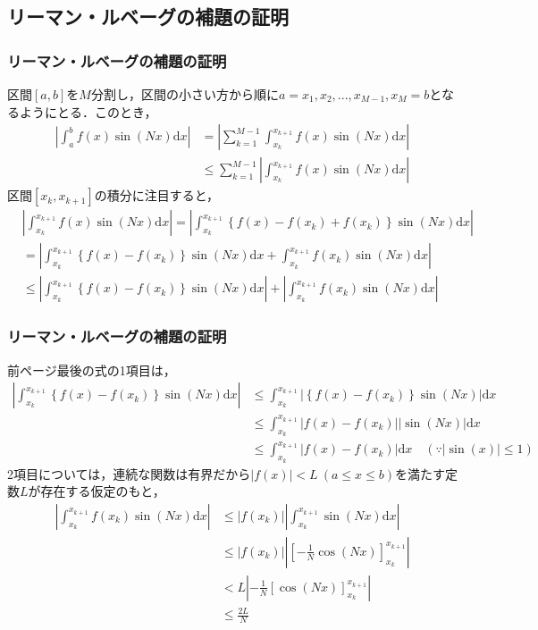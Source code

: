 \documentclass[dvipdfmx,graphicx,14pt]{beamer}
\begin{document}
\subsection{リーマン・ルベーグの補題の証明}

\begin{frame}[c]
    \frametitle{リーマン・ルベーグの補題の証明}
    \scriptsize
    区間$[a,b]$を$M$分割し，区間の小さい方から順に$a = x_{1}, x_{2}, ..., x_{M-1}, x_{M} = b$となるようにとる．このとき，
    \begin{align*}
        \left| \int_{a}^{b} f(x) \sin(Nx) \mathrm{d} x \right| &= \left| \sum_{k=1}^{M-1} \int_{x_{k}}^{x_{k+1}} f(x) \sin(Nx) \mathrm{d} x \right| \\
        &\leq \sum_{k=1}^{M-1} \left| \int_{x_{k}}^{x_{k+1}} f(x) \sin(Nx) \mathrm{d} x \right|
    \end{align*}
    区間$[x_{k}, x_{k+1}]$の積分に注目すると，
    \begin{align*}
        & \left| \int_{x_{k}}^{x_{k+1}} f(x) \sin(Nx) \mathrm{d} x \right| = \left| \int_{x_{k}}^{x_{k+1}} \left\{ f(x) - f(x_{k}) + f(x_{k}) \right\} \sin(Nx) \mathrm{d} x \right| \\
        &= \left| \int_{x_{k}}^{x_{k+1}} \left\{ f(x) - f(x_{k}) \right\} \sin(Nx) \mathrm{d} x + \int_{x_{k}}^{x_{k+1}} f(x_{k}) \sin(Nx) \mathrm{d} x \right| \\
        &\leq \left| \int_{x_{k}}^{x_{k+1}} \left\{ f(x) - f(x_{k}) \right\} \sin(Nx) \mathrm{d} x \right| + \left| \int_{x_{k}}^{x_{k+1}} f(x_{k}) \sin(Nx) \mathrm{d} x \right|
    \end{align*}
\end{frame}

\begin{frame}[c]
    \frametitle{リーマン・ルベーグの補題の証明}
    \scriptsize
    前ページ最後の式の1項目は，
    \begin{align*}
        \left| \int_{x_{k}}^{x_{k+1}} \left\{ f(x) - f(x_{k}) \right\} \sin(Nx) \mathrm{d} x \right| &\leq \int_{x_{k}}^{x_{k+1}} | \left\{ f(x) - f(x_{k}) \right\} \sin(Nx) | \mathrm{d} x \\
        &\leq \int_{x_{k}}^{x_{k+1}} | f(x) - f(x_{k}) | | \sin(Nx) | \mathrm{d} x \\
        &\leq \int_{x_{k}}^{x_{k+1}} | f(x) - f(x_{k}) | \mathrm{d} x \quad (\because |\sin(x)| \leq 1)
    \end{align*}
    2項目については，連続な関数は有界だから$|f(x)| < L\ (a \leq x \leq b)$を満たす定数$L$が存在する仮定のもと，
    \begin{align*}
        \left| \int_{x_{k}}^{x_{k+1}} f(x_{k}) \sin(Nx) \mathrm{d} x \right| &\leq |f(x_{k})| \left| \int_{x_{k}}^{x_{k+1}} \sin(Nx) \mathrm{d} x \right| \\
        &\leq |f(x_{k})| \left| \left[ -\frac{1}{N} \cos(Nx) \right]_{x_{k}}^{x_{k+1}} \right| \\
        &< L \left| -\frac{1}{N} \left[ \cos(Nx) \right]_{x_{k}}^{x_{k+1}} \right| \\
        &\leq \frac{2L}{N}
    \end{align*}
\end{frame}
\end{document}
